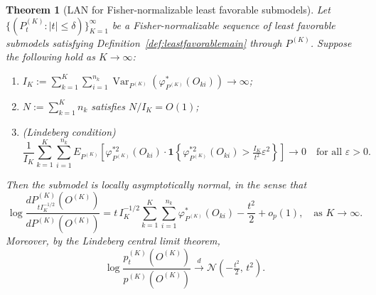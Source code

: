 \documentclass[11pt]{article}
\theoremstyle{plain}
\newtheorem{theorem}{Theorem}
\theoremstyle{definition}
\theoremstyle{remark}
\theoremstyle{definition}
\begin{document}
\begin{theorem}[LAN for Fisher-normalizable least favorable submodels]
\label{theorem::LAN}
Let \( \{(P_t^{(K)} : |t| \leq \delta)\}_{K=1}^\infty \) be a Fisher-normalizable sequence of least favorable submodels satisfying Definition~\ref{def:leastfavorablemain} through \( P^{(K)} \). Suppose the following hold as \( K \to \infty \):
\begin{enumerate}
\item[(i)] \( I_K :=  \sum_{k=1}^K \sum_{i=1}^{n_k} \operatorname{Var}_{P^{(K)}}(\varphi_{P^{(K)}}^*(O_{ki})  ) \to \infty \);
\item[(ii)] \( N := \sum_{k=1}^K n_k \) satisfies \( N/I_K = O(1) \);
\item[(iii)] (Lindeberg condition)
\[
\frac{1}{I_K} \sum_{k=1}^K \sum_{i=1}^{n_k} 
E_{P^{(K)}}\left[ \varphi^{*2}_{P^{(K)}}(O_{ki}) \cdot 
\mathbf{1}\left\{ \varphi^{*2}_{P^{(K)}}(O_{ki}) > \tfrac{I_K}{t^2} \varepsilon^2 \right\} \right] \to 0
\quad \text{for all } \varepsilon > 0.
\]
\end{enumerate}
Then the submodel is locally asymptotically normal, in the sense that
\[
\log \frac{dP_{t I_K^{-1/2}}^{(K)}(O^{(K)})}{dP^{(K)}(O^{(K)})} 
= t\,I_K^{-1/2} \sum_{k=1}^K \sum_{i=1}^{n_k} \varphi_{P^{(K)}}^*(O_{ki}) 
- \frac{t^2}{2} + o_p(1),
\quad \text{as } K \to \infty.
\]
Moreover, by the Lindeberg central limit theorem,
$$\log \frac{p_t^{(K)}(O^{(K)})}{p^{(K)}(O^{(K)})} \overset{d}{\to} \mathcal{N}\left( -\tfrac{t^2}{2},\, t^2 \right).$$
\end{theorem}
\end{document}
